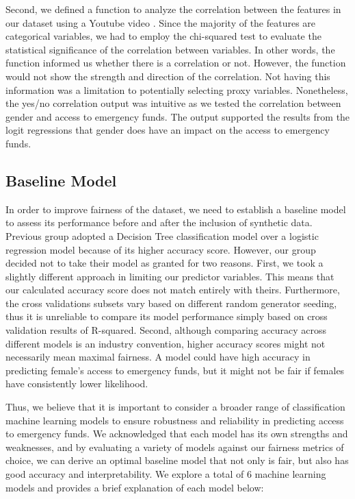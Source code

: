\documentclass[12pt]{article}
\begin{document}
Second, we defined a function to analyze the correlation between the
features in our dataset using a Youtube video \citep{ML_explained}.
Since the majority of the features are categorical variables, we had to
employ the chi-squared test to evaluate the statistical significance of
the correlation between variables. In other words, the function informed
us whether there is a correlation or not. However, the function would
not show the strength and direction of the correlation. Not having this
information was a limitation to potentially selecting proxy variables.
Nonetheless, the yes/no correlation output was intuitive as we tested
the correlation between gender and access to emergency funds. The output
supported the results from the logit regressions that gender does have
an impact on the access to emergency funds.

\hypertarget{baseline-model}{%
\subsection{Baseline Model}\label{baseline-model}}

In order to improve fairness of the dataset, we need to establish a
baseline model to assess its performance before and after the inclusion
of synthetic data. Previous group adopted a Decision Tree classification
model over a logistic regression model because of its higher accuracy
score. However, our group decided not to take their model as granted for
two reasons. First, we took a slightly different approach in limiting
our predictor variables. This means that our calculated accuracy score
does not match entirely with theirs. Furthermore, the cross validations
subsets vary based on different random generator seeding, thus it is
unreliable to compare its model performance simply based on cross
validation results of R-squared. Second, although comparing accuracy
across different models is an industry convention, higher accuracy
scores might not necessarily mean maximal fairness. A model could have
high accuracy in predicting female's access to emergency funds, but it
might not be fair if females have consistently lower likelihood.

Thus, we believe that it is important to consider a broader range of
classification machine learning models to ensure robustness and
reliability in predicting access to emergency funds. We acknowledged
that each model has its own strengths and weaknesses, and by evaluating
a variety of models against our fairness metrics of choice, we can
derive an optimal baseline model that not only is fair, but also has
good accuracy and interpretability. We explore a total of 6 machine
learning models and provides a brief explanation of each model below:
\end{document}
